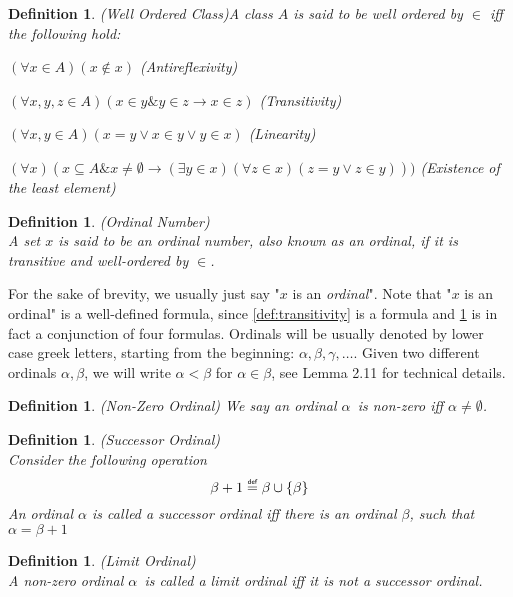 \documentclass[12pt,a4paper]{article}
\newtheorem{definition}[theorem]{Definition}
\newcommand{\then}{\rightarrow}
\newcommand{\bce}{\begin{compactenum}}
\newcommand{\ece}{\end{compactenum}}
\newcommand{\et}{\mathrel{\&}}
\newcommand\defeq{\mathrel{\overset{\makebox[0pt]{\mbox{\normalfont\tiny\sffamily def}}}{=}}}
\begin{document}
\begin{definition}{(Well Ordered Class)}\label{def:well_ordering}
A class $A$ is said to be \emph{well ordered by $\in$} iff the following hold:
\bce[(i)]
\item $(\forall x \in A)(x \not\in x)$ (Antireflexivity)
\item $(\forall x, y, z \in A)(x \in y \et y \in z \then x \in z)$ (Transitivity)
\item $(\forall x, y \in A)(x = y \lor x \in y \lor y \in x)$ (Linearity)
\item $(\forall x)(x \subseteq A \et x \neq \emptyset \then (\exists y \in x)(\forall z \in x)(z = y \lor z \in y)))$ (Existence of the least element)
\ece
\end{definition}

\begin{definition}{(Ordinal Number)}\label{def:ordinal}\\
A set $x$ is said to be an \emph{ordinal number}, also known as an \emph{ordinal}, if it is \emph{transitive} and \emph{well-ordered by $\in$}. 
\end{definition}
For the sake of brevity, we usually just say "$x$ is an \emph{ordinal}". 
Note that "$x$ is an ordinal" is a well-defined formula, since \ref{def:transitivity} is a formula and \ref{def:well_ordering} is in fact a conjunction of four formulas.
Ordinals will be usually denoted by lower case greek letters, starting from the beginning: $\alpha, \beta, \gamma, \ldots$.
Given two different ordinals $\alpha, \beta$, we will write $\alpha < \beta$ for $\alpha \in \beta$, see \cite{JechBook}{Lemma 2.11} for technical details.

\begin{definition}{(Non-Zero Ordinal)}
We say an ordinal $\alpha$ is \emph{non-zero} iff $\alpha \neq \emptyset$.
\end{definition}

\begin{definition}{(Successor Ordinal)}\label{def:successor_ordinal}\\
Consider the following operation
\begin{equation}
\beta + 1 \defeq \beta \cup \{\beta\}
\end{equation}
An ordinal $\alpha$ is called \emph{a successor ordinal} iff there is an ordinal $\beta$, such that $\alpha = \beta+1$
\end{definition}

\begin{definition}{(Limit Ordinal)}\label{def:limit_ordinal}\\
A non-zero ordinal $\alpha$ is called a \emph{limit ordinal} iff it is not a successor ordinal.
\end{definition}
\end{document}
